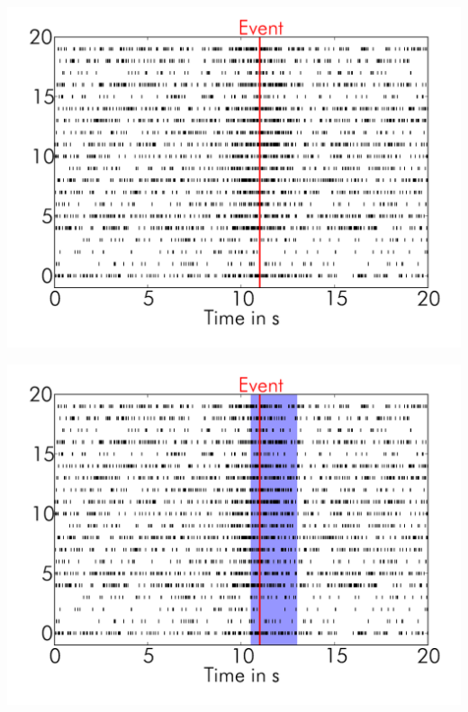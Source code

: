 \documentclass[17pt]{beamer}
\begin{document}
\begin{frame}
  \hspace*{-.055\columnwidth}
  \includegraphics[width=1.1\columnwidth]{spikes-2}
\end{frame}

\begin{frame}
  \hspace*{-.055\columnwidth}
  \includegraphics[width=1.1\columnwidth]{spikes-3}
\end{frame}
\end{document}

